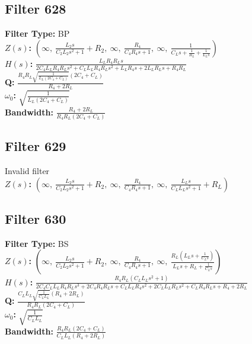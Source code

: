 \documentclass{article}
\begin{document}
\subsection*{Filter 628}
\textbf{Filter Type:} BP \\ 
\textbf{$Z(s)$:} $\left( \infty, \  \frac{L_{2} s}{C_{2} L_{2} s^{2} + 1} + R_{2}, \  \infty, \  \frac{R_{4}}{C_{4} R_{4} s + 1}, \  \infty, \  \frac{1}{C_{L} s + \frac{1}{R_{L}} + \frac{1}{L_{L} s}}\right)$ \\ 
\textbf{$H(s)$:} $\frac{L_{L} R_{4} R_{L} s}{2 C_{4} L_{L} R_{4} R_{L} s^{2} + C_{L} L_{L} R_{4} R_{L} s^{2} + L_{L} R_{4} s + 2 L_{L} R_{L} s + R_{4} R_{L}}$ \\ 
\textbf{Q:} $\frac{R_{4} R_{L} \sqrt{\frac{1}{L_{L} \left(2 C_{4} + C_{L}\right)}} \left(2 C_{4} + C_{L}\right)}{R_{4} + 2 R_{L}}$ \\ 
\textbf{$\omega_0$:} $\sqrt{\frac{1}{L_{L} \left(2 C_{4} + C_{L}\right)}}$ \\ 
\textbf{Bandwidth:} $\frac{R_{4} + 2 R_{L}}{R_{4} R_{L} \left(2 C_{4} + C_{L}\right)}$ \\ 
\subsection*{Filter 629}
Invalid filter \\ 
\textbf{$Z(s)$:} $\left( \infty, \  \frac{L_{2} s}{C_{2} L_{2} s^{2} + 1} + R_{2}, \  \infty, \  \frac{R_{4}}{C_{4} R_{4} s + 1}, \  \infty, \  \frac{L_{L} s}{C_{L} L_{L} s^{2} + 1} + R_{L}\right)$ \\ 
\subsection*{Filter 630}
\textbf{Filter Type:} BS \\ 
\textbf{$Z(s)$:} $\left( \infty, \  \frac{L_{2} s}{C_{2} L_{2} s^{2} + 1} + R_{2}, \  \infty, \  \frac{R_{4}}{C_{4} R_{4} s + 1}, \  \infty, \  \frac{R_{L} \left(L_{L} s + \frac{1}{C_{L} s}\right)}{L_{L} s + R_{L} + \frac{1}{C_{L} s}}\right)$ \\ 
\textbf{$H(s)$:} $\frac{R_{4} R_{L} \left(C_{L} L_{L} s^{2} + 1\right)}{2 C_{4} C_{L} L_{L} R_{4} R_{L} s^{3} + 2 C_{4} R_{4} R_{L} s + C_{L} L_{L} R_{4} s^{2} + 2 C_{L} L_{L} R_{L} s^{2} + C_{L} R_{4} R_{L} s + R_{4} + 2 R_{L}}$ \\ 
\textbf{Q:} $\frac{C_{L} L_{L} \sqrt{\frac{1}{C_{L} L_{L}}} \left(R_{4} + 2 R_{L}\right)}{R_{4} R_{L} \left(2 C_{4} + C_{L}\right)}$ \\ 
\textbf{$\omega_0$:} $\sqrt{\frac{1}{C_{L} L_{L}}}$ \\ 
\textbf{Bandwidth:} $\frac{R_{4} R_{L} \left(2 C_{4} + C_{L}\right)}{C_{L} L_{L} \left(R_{4} + 2 R_{L}\right)}$ \\ 
\end{document}
